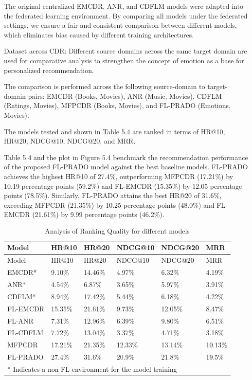 The original centralized EMCDR, ANR, and CDFLM models were adapted into the federated learning environment. By comparing all models under the federated settings, we ensure a fair and consistent comparison between different models, which eliminates bias caused by different training architectures.

Dataset across CDR: Different source domains across the same target domain are used for comparative analysis to strengthen the concept of emotion as a base for personalized recommendation.

The comparison is performed across the following source-domain to target-domain pairs: EMCDR (Books, Movies), ANR (Music, Movies), CDFLM (Ratings, Movies), MFPCDR (Books, Movies), and FL-PRADO (Emotions, Movies).

The models tested and shown in Table 5.4 are ranked in terms of HR@10, HR@20, NDCG@10, NDCG@20, and MRR.

Table 5.4 and the plot in Figure 5.4 benchmark the recommendation performance of the proposed FL-PRADO model against the best baseline models. FL-PRADO achieves the highest HR@10 of 27.4\%, outperforming MFPCDR (17.21\%) by 10.19 percentage points (59.2\%) and FL-EMCDR (15.35\%) by 12.05 percentage points (78.5\%). Similarly, FL-PRADO attains the best HR@20 of 31.6\%, exceeding MFPCDR (21.35\%) by 10.25 percentage points (48.0\%) and FL-EMCDR (21.61\%) by 9.99 percentage points (46.2\%).

\begin{longtable}{|p{2.5cm}|p{2cm}|p{2cm}|p{2cm}|p{2cm}|p{2cm}|}
\caption{Analysis of Ranking Quality for different models}
\label{tab:ch5_t4} \\
\hline
Model & HR@10 & HR@20 & NDCG@10 & NDCG@20 & MRR \\
\hline
\endfirsthead
\hline
Model & HR@10 & HR@20 & NDCG@10 & NDCG@20 & MRR \\
\hline
\endhead
\hline
\endfoot
EMCDR* & 9.10\% & 14.46\% & 4.97\% & 6.32\% & 4.19\% \\
\hline
ANR* & 4.54\% & 6.87\% & 3.65\% & 5.97\% & 3.91\% \\
\hline
CDFLM* & 8.94\% & 17.42\% & 5.44\% & 6.18\% & 4.22\% \\
\hline
FL-EMCDR & 15.35\% & 21.61\% & 9.73\% & 12.05\% & 8.47\% \\
\hline
FL-ANR & 7.31\% & 12.96\% & 6.39\% & 9.80\% & 6.51\% \\
\hline
FL-CDFLM & 7.72\% & 13.04\% & 3.37\% & 4.71\% & 3.18\% \\
\hline
MFPCDR & 17.21\% & 21.35\% & 12.33\% & 13.14\% & 10.13\% \\
\hline
FL-PRADO & 27.4\% & 31.6\% & 20.9\% & 21.8\% & 19.5\% \\
\hline
\multicolumn{6}{|l|}{* Indicates a non-FL environment for the model training} \\
\hline
\end{longtable}

